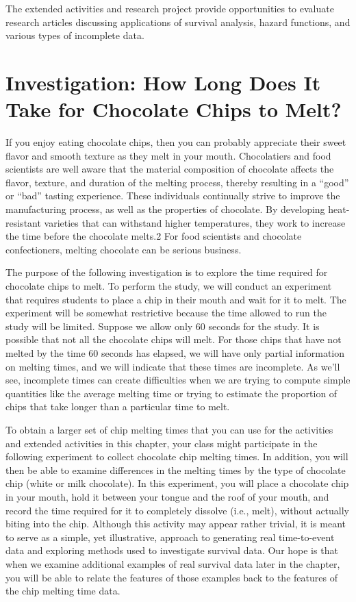 \documentclass[
]{report}
\begin{document}
The extended activities and research project provide opportunities to evaluate research articles discussing applications of survival analysis, hazard functions, and various types of incomplete data.

\section{\texorpdfstring{\textbf{Investigation: How Long Does It Take for Chocolate Chips to Melt?}}{Investigation: How Long Does It Take for Chocolate Chips to Melt?}}\label{investigation-how-long-does-it-take-for-chocolate-chips-to-melt}

If you enjoy eating chocolate chips, then you can probably appreciate their sweet flavor and smooth texture
as they melt in your mouth. Chocolatiers and food scientists are well aware that the material composition
of chocolate affects the flavor, texture, and duration of the melting process, thereby resulting in a ``good'' or
``bad'' tasting experience. These individuals continually strive to improve the manufacturing process, as well
as the properties of chocolate. By developing heat-resistant varieties that can withstand higher temperatures,
they work to increase the time before the chocolate melts.2 For food scientists and chocolate confectioners,
melting chocolate can be serious business.

The purpose of the following investigation is to explore the time required for chocolate chips to melt. To
perform the study, we will conduct an experiment that requires students to place a chip in their mouth and
wait for it to melt. The experiment will be somewhat restrictive because the time allowed to run the study
will be limited. Suppose we allow only 60 seconds for the study. It is possible that not all the chocolate chips
will melt. For those chips that have not melted by the time 60 seconds has elapsed, we will have only partial
information on melting times, and we will indicate that these times are incomplete. As we'll see, incomplete
times can create difficulties when we are trying to compute simple quantities like the average melting time or
trying to estimate the proportion of chips that take longer than a particular time to melt.

To obtain a larger set of chip melting times that you can use for the activities and extended activities
in this chapter, your class might participate in the following experiment to collect chocolate chip melting
times. In addition, you will then be able to examine differences in the melting times by the type of chocolate
chip (white or milk chocolate). In this experiment, you will place a chocolate chip in your mouth, hold it
between your tongue and the roof of your mouth, and record the time required for it to completely dissolve
(i.e., melt), without actually biting into the chip. Although this activity may appear rather trivial, it is meant
to serve as a simple, yet illustrative, approach to generating real time-to-event data and exploring methods
used to investigate survival data. Our hope is that when we examine additional examples of real survival data
later in the chapter, you will be able to relate the features of those examples back to the features of the chip
melting time data.
\end{document}
